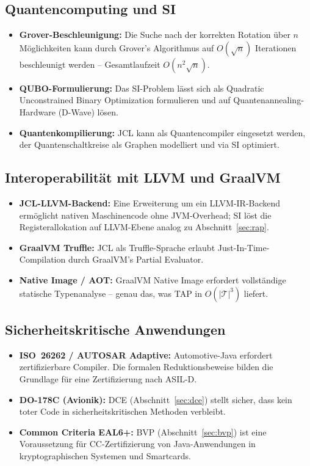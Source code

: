 ﻿\documentclass[a4paper,12pt]{article}
\theoremstyle{definition}
\begin{document}
\subsection{Quantencomputing und SI}

\begin{itemize}
    \item \textbf{Grover-Beschleunigung:} Die Suche nach der
          korrekten Rotation \"uber $n$ M\"oglichkeiten kann durch
          Grover's Algorithmus auf $O(\sqrt{n})$ Iterationen
          beschleunigt werden -- Gesamtlaufzeit $O(n^2\sqrt{n})$.
    \item \textbf{QUBO-Formulierung:} Das SI-Problem l\"asst sich
          als Quadratic Unconstrained Binary Optimization formulieren
          und auf Quantenannealing-Hardware (D-Wave) l\"osen.
    \item \textbf{Quantenkompilierung:} JCL kann als
          Quantencompiler eingesetzt werden, der Quantenschaltkreise
          als Graphen modelliert und via SI optimiert.
\end{itemize}

\subsection{Interoperabilit\"at mit LLVM und GraalVM}

\begin{itemize}
    \item \textbf{JCL-LLVM-Backend:} Eine Erweiterung um ein
          LLVM-IR-Backend erm\"oglicht nativen Maschinencode ohne
          JVM-Overhead; SI l\"ost die Registerallokation auf
          LLVM-Ebene analog zu Abschnitt~\ref{sec:rap}.
    \item \textbf{GraalVM Truffle:} JCL als Truffle-Sprache erlaubt
          Just-In-Time-Compilation durch GraalVM's Partial Evaluator.
    \item \textbf{Native Image / AOT:} GraalVM Native Image erfordert
          vollst\"andige statische Typenanalyse -- genau das, was
          TAP in $O(|\mathcal{T}|^3)$ liefert.
\end{itemize}

\subsection{Sicherheitskritische Anwendungen}

\begin{itemize}
    \item \textbf{ISO~26262 / AUTOSAR Adaptive:} Automotive-Java
          erfordert zertifizierbare Compiler.  Die formalen
          Reduktionsbeweise bilden die Grundlage f\"ur eine
          Zertifizierung nach ASIL-D.
    \item \textbf{DO-178C (Avionik):} DCE (Abschnitt~\ref{sec:dce})
          stellt sicher, dass kein toter Code in
          sicherheitskritischen Methoden verbleibt.
    \item \textbf{Common Criteria EAL6+:} BVP
          (Abschnitt~\ref{sec:bvp}) ist eine Voraussetzung f\"ur
          CC-Zertifizierung von Java-Anwendungen in
          kryptographischen Systemen und Smartcards.
\end{itemize}
\end{document}
